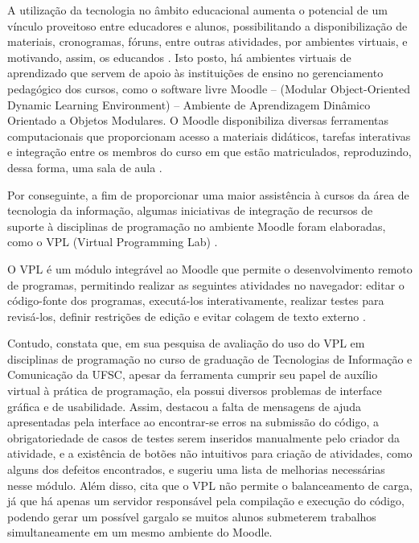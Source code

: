 




A utilização da tecnologia no âmbito educacional aumenta o potencial de um vínculo proveitoso entre educadores e alunos, possibilitando a disponibilização de materiais, cronogramas, fóruns, entre outras atividades, por ambientes virtuais, e motivando, assim, os educandos  \cite[p.~18-19]{franciscojuniorambrosio}. Isto posto, há ambientes virtuais de aprendizado que servem de apoio às instituições de ensino no gerenciamento pedagógico dos cursos, como o software livre Moodle – (Modular Object-Oriented Dynamic Learning Environment) – Ambiente de Aprendizagem Dinâmico Orientado a Objetos Modulares. O Moodle disponibiliza diversas ferramentas computacionais que proporcionam acesso a materiais didáticos, tarefas interativas e integração entre os membros do curso em que estão matriculados, reproduzindo, dessa forma, uma sala de aula \cite{limamoodle}. 

Por conseguinte, a fim de proporcionar uma maior assistência à cursos da área de tecnologia da informação, algumas iniciativas de integração de recursos de suporte à disciplinas de programação no ambiente Moodle foram elaboradas, como o VPL (Virtual Programming Lab)  \cite[p.~712]{franca2011}. 

O VPL é um módulo integrável ao Moodle que permite o desenvolvimento remoto de programas, permitindo realizar as seguintes atividades no navegador: editar o código-fonte dos programas, executá-los interativamente, realizar testes para revisá-los, definir restrições de edição e evitar colagem de texto externo \cite{rodriguezdelpino}. 

Contudo, \textcite[p.~129]{freitas} constata que, em sua pesquisa de avaliação do uso do VPL em disciplinas de programação no curso de graduação de Tecnologias de Informação e Comunicação da UFSC, apesar da ferramenta cumprir seu papel de auxílio virtual à prática de programação, ela possui diversos problemas de interface gráfica e de usabilidade. Assim, destacou a falta de mensagens de ajuda apresentadas pela interface ao encontrar-se erros na submissão do código, a obrigatoriedade de casos de testes serem inseridos manualmente pelo criador da atividade, e a existência de botões não intuitivos para criação de atividades, como alguns dos defeitos encontrados, e sugeriu uma lista de melhorias necessárias nesse módulo.  Além disso, \textcite[p.~58]{freitas} cita que o VPL não permite o balanceamento de carga, já que há apenas um servidor responsável pela compilação e execução do código, podendo gerar um possível gargalo se muitos alunos submeterem trabalhos simultaneamente em um mesmo ambiente do Moodle. 

